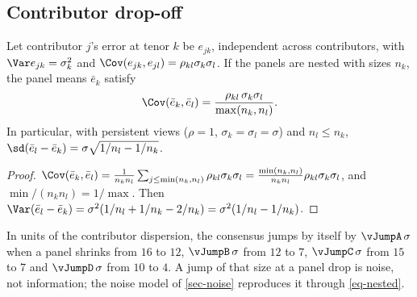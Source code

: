 \subsection{Contributor drop-off}
\begin{proposition}\label{prop-nested}
Let contributor $j$'s error at tenor $k$ be $e_{jk}$, independent across contributors, with $\Var e_{jk}=\sigma_k^2$
and $\Cov(e_{jk},e_{jl})=\rho_{kl}\sigma_k\sigma_l$. If the panels are nested with sizes $n_k$, the panel means
$\bar e_k$ satisfy
\begin{equation}\label{eq-nested}
\Cov(\bar e_k,\bar e_l)=\frac{\rho_{kl}\,\sigma_k\sigma_l}{\max(n_k,n_l)}.
\end{equation}
In particular, with persistent views ($\rho=1$, $\sigma_k=\sigma_l=\sigma$) and $n_l\le n_k$,
$\sd(\bar e_l-\bar e_k)=\sigma\sqrt{1/n_l-1/n_k}$.
\end{proposition}
\begin{proof}
$\Cov(\bar e_k,\bar e_l)=\frac{1}{n_kn_l}\sum_{j\le\min(n_k,n_l)}\rho_{kl}\sigma_k\sigma_l
=\frac{\min(n_k,n_l)}{n_kn_l}\rho_{kl}\sigma_k\sigma_l$, and $\min/(n_kn_l)=1/\max$. Then
$\Var(\bar e_l-\bar e_k)=\sigma^2(1/n_l+1/n_k-2/n_k)=\sigma^2(1/n_l-1/n_k)$.
\end{proof}

\begin{example}
In units of the contributor dispersion, the consensus jumps by itself by $\vJumpA\,\sigma$ when a panel shrinks from
$16$ to $12$, $\vJumpB\,\sigma$ from $12$ to $7$, $\vJumpC\,\sigma$ from $15$ to $7$ and $\vJumpD\,\sigma$ from $10$
to $4$. A jump of that size at a panel drop is noise, not information; the noise model of \cref{sec-noise} reproduces
it through \cref{eq-nested}.
\end{example}

